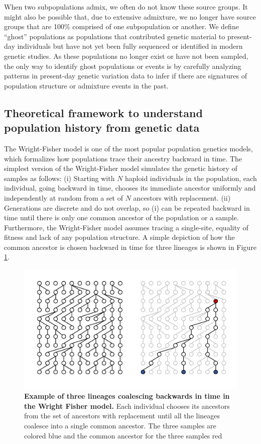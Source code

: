 When two subpopulations admix, we often do not know these source groups. It might also be possible that, due to extensive admixture, we no longer have source groups that are 100\% comprised of one subpopulation or another. We define ``ghost'' populations as populations that contributed genetic material to present-day individuals but have not yet been fully sequenced or identified in modern genetic studies. As these populations no longer exist or have not been sampled, the only way to identify ghost populations or events is by carefully analyzing patterns in present-day genetic variation data to infer if there are signatures of population structure or admixture events in the past.

\subsection{Theoretical framework to understand population history from genetic data}
\label{sec:ch1-gb-theory}

The Wright-Fisher model \cite{Wright1931, Fisher1930} is one of the most popular population genetics models, which formalizes how populations trace their ancestry backward in time.  The simplest version of the Wright-Fisher model simulates the genetic history of samples as follows: (i) Starting with $N$ haploid individuals in the population, each individual, going backward in time, chooses its immediate ancestor uniformly and independently at random from a set of $N$ ancestors with replacement. (ii) Generations are discrete and do not overlap, so (i) can be repeated backward in time until there is only one common ancestor of the population or a sample. Furthermore, the Wright-Fisher model assumes tracing a single-site, equality of fitness and lack of any population structure. A simple depiction of how the common ancestor is chosen backward in time for three lineages is shown in Figure \ref{fig:coalescent}.

\begin{figure}[h!]
    \centering
    \includegraphics[width=\linewidth]{figures/wright_fisher.pdf}
    \caption{\textbf{Example of three lineages coalescing backwards in time in the Wright Fisher model.} Each individual chooses its ancestors from the set of ancestors with replacement until all the lineages coalesce into a single common ancestor. The three samples are colored blue and the common ancestor for the three samples red }
    \label{fig:coalescent}
\end{figure}

